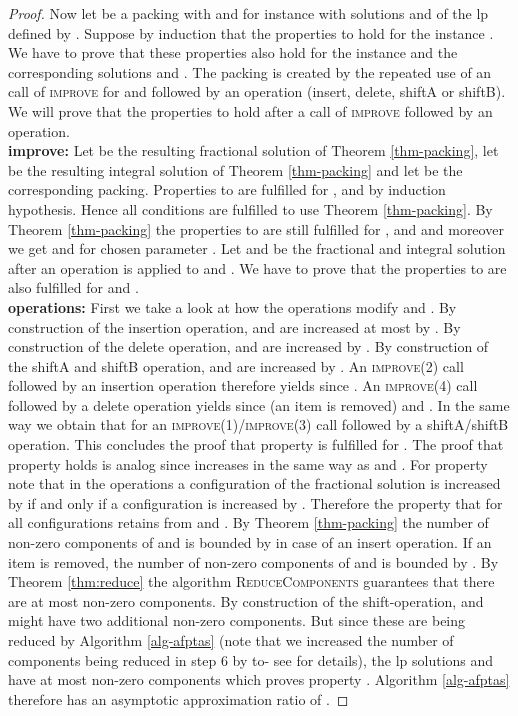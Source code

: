 \begin{proof}
    Now let  be a packing with  and  for instance  with solutions  and  of the \ac{lp} defined by . Suppose by induction that the properties  to  hold for the instance . We have to prove that these properties also hold for the instance  and the corresponding solutions  and . The packing  is created by the repeated use of an
	call of \textsc{improve} for  and  followed by an operation (insert, delete, shiftA or shiftB).
    We will prove that the properties  to  hold after a call of \textsc{improve} followed by an operation.
	\\{\bf improve:} Let  be the resulting fractional solution of Theorem \ref{thm-packing}, let  be the resulting integral solution of Theorem \ref{thm-packing} and let  be the corresponding packing. Properties  to  are fulfilled 
	for ,  and  by induction hypothesis. Hence all conditions are fulfilled to use Theorem \ref{thm-packing}. 
	By Theorem \ref{thm-packing} the properties  to  are still fulfilled for ,  and  and moreover we get
	 and  for chosen parameter . Let  and  be the fractional and integral solution after an operation is applied to  and . We have to prove that the properties  to  are also fulfilled for  and .
	\\{\bf operations:} First we take a look at how the operations modify  and . By construction of the insertion operation,  and  are increased at most by . By construction of the delete operation,  and  are increased by . By construction of the shiftA and shiftB operation,  and  are increased by .
	An \textsc{improve}(2) call followed by an insertion operation therefore yields  since .
    An \textsc{improve}(4) call followed by a delete operation yields  since  (an item is removed) and . In the same way we obtain that  for an \textsc{improve}(1)/\textsc{improve}(3) call followed by a shiftA/shiftB operation. This concludes the proof that property  is fulfilled for .
	The proof that property  holds is analog since  increases in the same way as  and .
	For property  note that in the operations a configuration  of the fractional solution is increased by  if and only if a configuration  is increased by . Therefore the property that for all configurations  retains from  and . By Theorem \ref{thm-packing} the number of non-zero components of  and  is bounded by  in case of an insert operation. If an item is removed, the number of non-zero components of  and  is bounded by . By Theorem \ref{thm:reduce} the algorithm \textsc{ReduceComponents} guarantees that there are at most  non-zero components. By construction of the shift-operation,  and  might have two additional non-zero components. But since these are being reduced by Algorithm \ref{alg-afptas} (note that we increased the number of components being reduced in step 6 by  to- see \cite{jansen2013binpacking} for details), the \ac{lp} solutions  and  have at most  non-zero components which proves property . Algorithm \ref{alg-afptas} therefore has an asymptotic approximation ratio of .
    

\end{proof}
